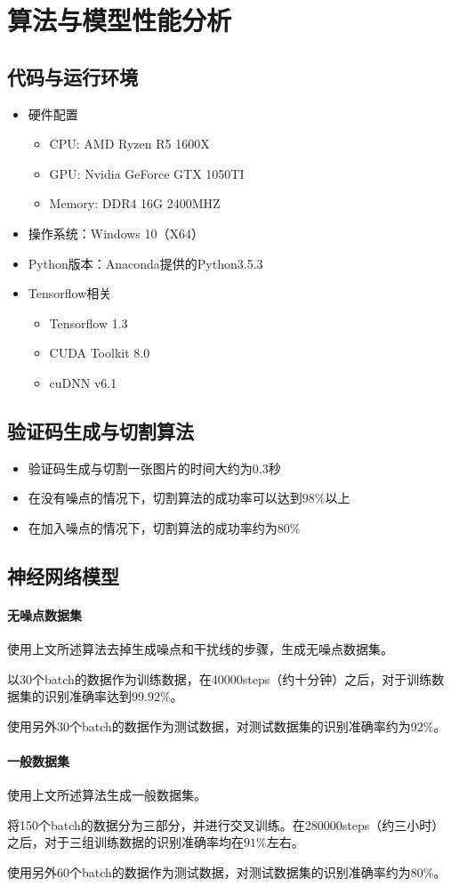 \documentclass[11pt,UTF8]{article}
\begin{document}
\section{算法与模型性能分析}
\subsection{代码与运行环境}
	\begin{itemize}
	\item 硬件配置
		\begin{itemize}
		\item CPU: AMD Ryzen R5 1600X
		\item GPU: Nvidia GeForce GTX 1050TI
		\item Memory: DDR4 16G 2400MHZ
		\end{itemize}
	\item 操作系统：Windows 10（X64）
	\item Python版本：Anaconda提供的Python3.5.3
	\item Tensorflow相关
		\begin{itemize}
		\item Tensorflow 1.3
		\item CUDA Toolkit 8.0
		\item cuDNN v6.1
		\end{itemize}
	\end{itemize}
\subsection{验证码生成与切割算法}
	\begin{itemize}
	\item 验证码生成与切割一张图片的时间大约为0.3秒
	\item 在没有噪点的情况下，切割算法的成功率可以达到$98\%$以上
	\item 在加入噪点的情况下，切割算法的成功率约为$80\%$
	\end{itemize}
\subsection{神经网络模型}
\paragraph{无噪点数据集}
	使用上文所述算法去掉生成噪点和干扰线的步骤，生成无噪点数据集。
	
	以30个batch的数据作为训练数据，在40000steps（约十分钟）之后，对于训练数据集的识别准确率达到$99.92\%$。

	使用另外30个batch的数据作为测试数据，对测试数据集的识别准确率约为$92\%$。
\paragraph{一般数据集}
	使用上文所述算法生成一般数据集。

	将150个batch的数据分为三部分，并进行交叉训练。在280000steps（约三小时）之后，对于三组训练数据的识别准确率均在$91\%$左右。

	使用另外60个batch的数据作为测试数据，对测试数据集的识别准确率约为$80\%$。
\end{document}
